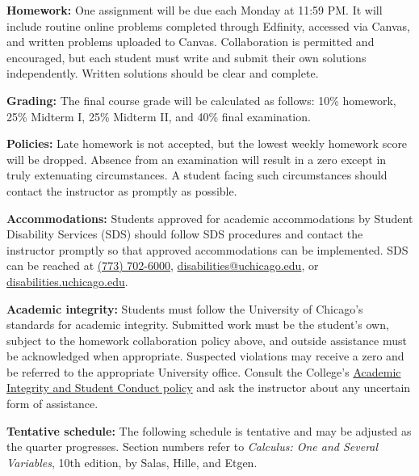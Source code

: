 \documentclass[12pt,letterpaper]{article}
\begin{document}
\textbf{Homework:} One assignment will be due each Monday at 11:59 PM. It will include routine online problems completed through Edfinity, accessed via Canvas, and written problems uploaded to Canvas. Collaboration is permitted and encouraged, but each student must write and submit their own solutions independently. Written solutions should be clear and complete.

\textbf{Grading:} The final course grade will be calculated as follows: 10\% homework, 25\% Midterm I, 25\% Midterm II, and 40\% final examination.

\textbf{Policies:} Late homework is not accepted, but the lowest weekly homework score will be dropped. Absence from an examination will result in a zero except in truly extenuating circumstances. A student facing such circumstances should contact the instructor as promptly as possible.

\textbf{Accommodations:} Students approved for academic accommodations by Student Disability Services (SDS) should follow SDS procedures and contact the instructor promptly so that approved accommodations can be implemented. SDS can be reached at \href{tel:+17737026000}{(773) 702-6000}, \href{mailto:disabilities@uchicago.edu}{disabilities@uchicago.edu}, or \href{https://disabilities.uchicago.edu/}{disabilities.uchicago.edu}.

\textbf{Academic integrity:} Students must follow the University of Chicago's standards for academic integrity. Submitted work must be the student's own, subject to the homework collaboration policy above, and outside assistance must be acknowledged when appropriate. Suspected violations may receive a zero and be referred to the appropriate University office. Consult the College's \href{https://college.uchicago.edu/student-services/academic-integrity-student-conduct}{Academic Integrity and Student Conduct policy} and ask the instructor about any uncertain form of assistance.


\textbf{Tentative schedule:} The following schedule is tentative and may be adjusted as the quarter progresses. Section numbers refer to \textit{Calculus: One and Several Variables}, 10th edition, by Salas, Hille, and Etgen.
\end{document}
